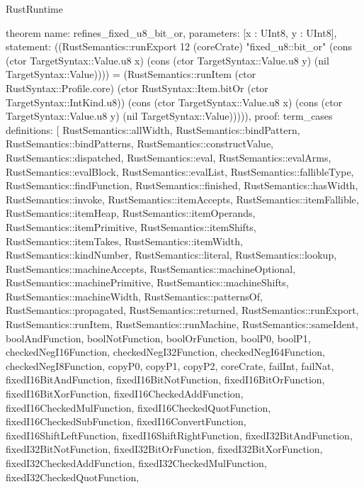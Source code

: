 \begin{lexlean}{RustRuntime}
\begin{semanticmodule}
theorem{
  name: refines_fixed_u8_bit_or,
  parameters: [x : UInt8, y : UInt8],
  statement: ((RustSemantics::runExport 12 (coreCrate) "fixed_u8::bit_or" (cons (ctor TargetSyntax::Value.u8 x) (cons (ctor TargetSyntax::Value.u8 y) (nil TargetSyntax::Value)))) = (RustSemantics::runItem (ctor RustSyntax::Profile.core) (ctor RustSyntax::Item.bitOr (ctor TargetSyntax::IntKind.u8)) (cons (ctor TargetSyntax::Value.u8 x) (cons (ctor TargetSyntax::Value.u8 y) (nil TargetSyntax::Value))))),
  proof: term_cases{
    definitions: [
      RustSemantics::allWidth,
      RustSemantics::bindPattern,
      RustSemantics::bindPatterns,
      RustSemantics::constructValue,
      RustSemantics::dispatched,
      RustSemantics::eval,
      RustSemantics::evalArms,
      RustSemantics::evalBlock,
      RustSemantics::evalList,
      RustSemantics::fallibleType,
      RustSemantics::findFunction,
      RustSemantics::finished,
      RustSemantics::hasWidth,
      RustSemantics::invoke,
      RustSemantics::itemAccepts,
      RustSemantics::itemFallible,
      RustSemantics::itemHeap,
      RustSemantics::itemOperands,
      RustSemantics::itemPrimitive,
      RustSemantics::itemShifts,
      RustSemantics::itemTakes,
      RustSemantics::itemWidth,
      RustSemantics::kindNumber,
      RustSemantics::literal,
      RustSemantics::lookup,
      RustSemantics::machineAccepts,
      RustSemantics::machineOptional,
      RustSemantics::machinePrimitive,
      RustSemantics::machineShifts,
      RustSemantics::machineWidth,
      RustSemantics::patternsOf,
      RustSemantics::propagated,
      RustSemantics::returned,
      RustSemantics::runExport,
      RustSemantics::runItem,
      RustSemantics::runMachine,
      RustSemantics::sameIdent,
      boolAndFunction,
      boolNotFunction,
      boolOrFunction,
      boolP0,
      boolP1,
      checkedNegI16Function,
      checkedNegI32Function,
      checkedNegI64Function,
      checkedNegI8Function,
      copyP0,
      copyP1,
      copyP2,
      coreCrate,
      failInt,
      failNat,
      fixedI16BitAndFunction,
      fixedI16BitNotFunction,
      fixedI16BitOrFunction,
      fixedI16BitXorFunction,
      fixedI16CheckedAddFunction,
      fixedI16CheckedMulFunction,
      fixedI16CheckedQuotFunction,
      fixedI16CheckedSubFunction,
      fixedI16ConvertFunction,
      fixedI16ShiftLeftFunction,
      fixedI16ShiftRightFunction,
      fixedI32BitAndFunction,
      fixedI32BitNotFunction,
      fixedI32BitOrFunction,
      fixedI32BitXorFunction,
      fixedI32CheckedAddFunction,
      fixedI32CheckedMulFunction,
      fixedI32CheckedQuotFunction,
}}
\end{semanticmodule}
\end{lexlean}
